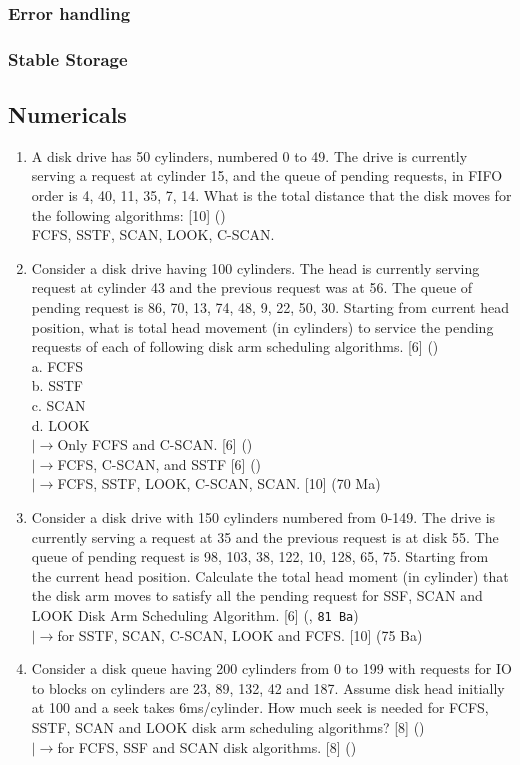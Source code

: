 \documentclass[12pt]{article}
\newcommand{\lb}{\\$\left|\rightarrow\right.$}
\begin{document}
		\subsubsection{Error handling}
		\subsubsection{Stable Storage}
	\subsection{Numericals}
		\begin{enumerate}
			\item A disk drive has 50 cylinders, numbered 0 to 49. The drive is currently serving a request at cylinder 15, and the queue of pending requests, in FIFO order is 4, 40, 11, 35, 7, 14. What is the total distance that the disk moves for the following algorithms: \hfill [10] ()\\
			FCFS, SSTF, SCAN, LOOK, C-SCAN.
			
			\item Consider a disk drive having 100 cylinders. The head is currently serving request at cylinder 43 and the previous request was at 56. The queue of pending request is 86, 70, 13, 74, 48, 9, 22, 50, 30. Starting from current head position, what is total head movement (in cylinders) to service the pending requests of each of following disk arm scheduling algorithms. \hfill [6] ()\\
			a. FCFS\\
			b. SSTF\\
			c. SCAN\\
			d. LOOK
			\lb Only FCFS and C-SCAN. \hfill [6] ()
			\lb FCFS, C-SCAN, and SSTF \hfill [6] ()
			\lb FCFS, SSTF, LOOK, C-SCAN, SCAN. \hfill [10] (70 Ma)

			\item Consider a disk drive with 150 cylinders numbered from 0-149. The drive is currently serving a request at 35 and the previous request is at disk 55. The queue of pending request is 98, 103, 38, 122, 10, 128, 65, 75. Starting from the current head position. Calculate the total head moment (in cylinder) that the disk arm moves to satisfy all the pending request for SSF, SCAN and LOOK Disk Arm Scheduling Algorithm. \hfill [6] (, \texttt{81 Ba})
			\lb for SSTF, SCAN, C-SCAN, LOOK and FCFS. \hfill [10] (75 Ba)

			\item Consider a disk queue having 200 cylinders from 0 to 199 with requests for IO to blocks on cylinders are 23, 89, 132, 42 and 187. Assume disk head initially at 100 and a seek takes 6ms/cylinder. How much seek is needed for FCFS, SSTF, SCAN and LOOK disk arm scheduling algorithms? \hfill [8] ()
			\lb for FCFS, SSF and SCAN disk algorithms. \hfill [8] ()


\end{enumerate}
\end{document}
